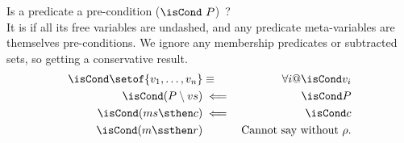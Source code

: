 Is a predicate a pre-condition ($\isCond~P$)~?
\\It is if all its free variables are undashed,
and any predicate meta-variables are themselves pre-conditions.
We ignore any membership predicates or subtracted sets,
so getting a conservative result.
\begin{eqnarray*}
  \isCond\setof{v_1,\ldots,v_n} &\equiv& \forall i @ \isCond v_i
\\\isCond(P \setminus vs) &\impliedby& \isCond P
\\\isCond(ms \sthen c) &\impliedby& \isCond c
\\\isCond(m \ssthen r) && \textrm{Cannot say without } \rho.
\end{eqnarray*} 